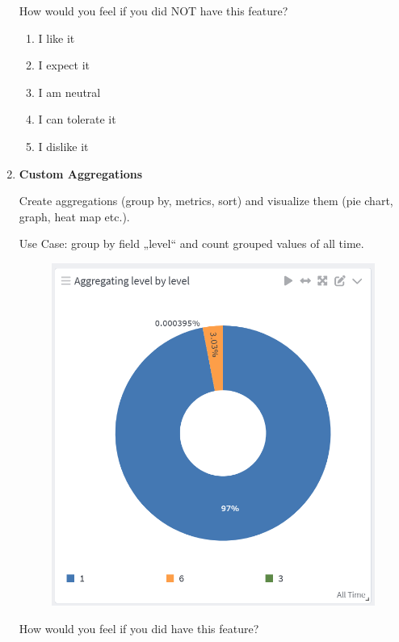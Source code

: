 \documentclass[../main.tex]{subfiles}
\begin{document}
\begin{enumerate}
    How would you feel if you did NOT have this feature?
    \begin{enumerate}
        \item I like it
        \item I expect it
        \item  I am neutral
        \item I can tolerate it
        \item I dislike it
    \end{enumerate}

    \clearpage
    \item \textbf{Custom Aggregations}
    
    Create aggregations (group by, metrics, sort) and visualize them (pie chart, graph, heat map etc.). 
    
    Use Case: group by field „level“ and count grouped values of all time.

    \begin{figure}[H]
        \centering
        \includegraphics[scale=0.8]{img/10-appendix/level_count_all_time.png}
        \label{fig:level_count}
    \end{figure}

    How would you feel if you did have this feature?
    

\end{enumerate}
\end{document}
